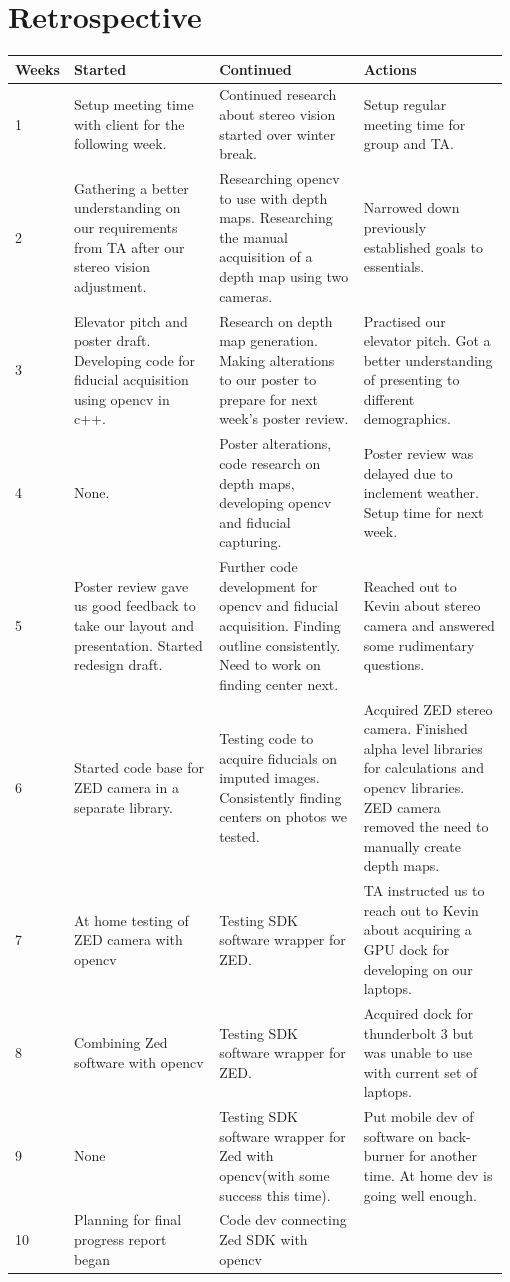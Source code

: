 \documentclass[onecolumn, draftclsnofoot,10pt, compsoc]{IEEEtran}
\begin{document}
\section{Retrospective}
\begin{longtable}{ | p{0.075\linewidth} | p{0.3\linewidth} | p{0.3\linewidth} | p{0.3\linewidth} |} \hline
Weeks & Started & Continued & Actions  \\ \hline
1 & Setup meeting time with client for the following week. & Continued research about stereo vision started over winter break. & Setup regular meeting time for group and TA. \\ \hline
2 & Gathering a better understanding on our requirements from TA after our stereo vision adjustment. & Researching opencv to use with depth maps. Researching the manual acquisition of a depth map using two cameras. & Narrowed down previously established goals to essentials. \\ \hline
3 & Elevator pitch and poster draft. 
Developing code for fiducial acquisition using opencv in c++.
 & Research on depth map generation. Making alterations to our poster to prepare for next week’s poster review. & Practised our elevator pitch. 
Got a better understanding of presenting to different demographics. \\ \hline
4 & None. & Poster alterations, code research on depth maps, developing opencv and fiducial capturing. & Poster review was delayed due to inclement weather. Setup time for next week. \\ \hline
5 & Poster review gave us good feedback to take our layout and presentation. Started redesign draft. & Further code development for opencv and fiducial acquisition. Finding outline consistently. Need to work on finding center next. & Reached out to Kevin about stereo camera and answered some rudimentary questions. \\ \hline
6 & Started code base for ZED camera in a separate library. & Testing code to acquire fiducials on imputed images. Consistently finding centers on photos we tested.  & Acquired ZED stereo camera. Finished alpha level libraries for calculations and opencv libraries. ZED camera removed the need to manually create depth maps. \\ \hline
7 & At home testing of ZED camera with opencv & Testing SDK software wrapper for ZED. & TA instructed us to reach out to Kevin about acquiring a GPU dock for developing on our laptops. \\ \hline
8 & Combining Zed software with opencv & Testing SDK software wrapper for ZED. & Acquired dock for thunderbolt 3 but was unable to use with current set of laptops. \\ \hline
9 & None & Testing SDK software wrapper for Zed with opencv(with some success this time). & Put mobile dev of software on back-burner for another time. At home dev is going well enough. \\ \hline
10 & Planning for final progress report began & Code dev connecting Zed SDK with opencv  & \\ \hline
\end{longtable}
\end{document}
